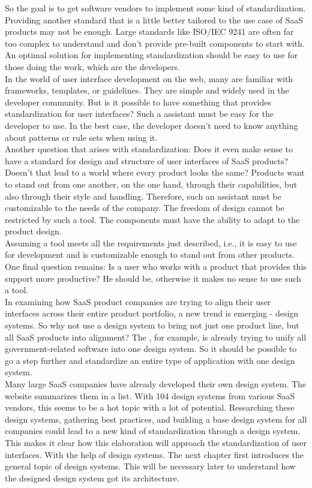 So the goal is to get software vendors to implement some kind of standardization. Providing another standard that is a little better tailored to the use case of \ac{SaaS} products may not be enough. Large standards like ISO/IEC 9241 are often far too complex to understand and don't provide pre-built components to start with. An optimal solution for implementing standardization should be easy to use for those doing the work, which are the developers. \\
In the world of user interface development on the web, many are familiar with frameworks, templates, or guidelines. They are simple and widely used in the developer community. But is it possible to have something that provides standardization for user interfaces? Such a assistant must be easy for the developer to use. In the best case, the developer doesn't need to know anything about patterns or rule sets when using it. \\
Another question that arises with standardization: Does it even make sense to have a standard for design and structure of user interfaces of \ac{SaaS} products? Doesn't that lead to a world where every product looks the same? Products want to stand out from one another, on the one hand, through their capabilities, but also through their style and handling. Therefore, such an assistant must be customizable to the needs of the company. The freedom of design cannot be restricted by such a tool. The components must have the ability to adapt to the product design. \\
Assuming a tool meets all the requirements just described, i.e., it is easy to use for development and is customizable enough to stand out from other products. One final question remains: Is a user who works with a product that provides this support more productive? He should be, otherwise it makes no sense to use such a tool. \\

In examining how \ac{SaaS} product companies are trying to align their user interfaces across their entire product portfolio, a new trend is emerging - design systems. So why not use a design system to bring not just one product line, but all \ac{SaaS} products into alignment? The , for example, is already trying to unify all government-related software into one design system. So it should be possible to go a step further and standardize an entire type of application with one design system. \\
Many large \ac{SaaS} companies have already developed their own design system. The  website summarizes them in a list. With 104 design systems from various \ac{SaaS} vendors, this seems to be a hot topic with a lot of potential. Researching these design systems, gathering best practices, and building a base design system for all companies could lead to a new kind of standardization through a design system. \\

This makes it clear how this elaboration will approach the standardization of user interfaces. With the help of design systems. The next chapter first introduces the general topic of design systems. This will be necessary later to understand how the designed design system got its architecture.